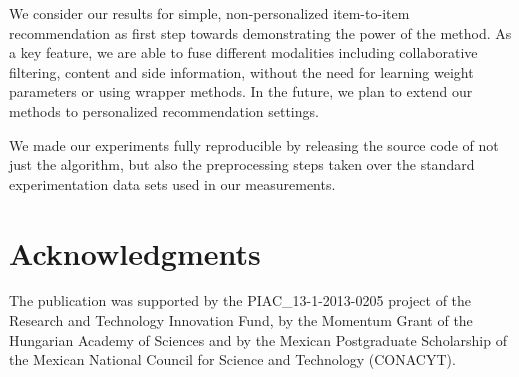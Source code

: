 We consider our results for simple, non-personalized item-to-item recommendation as first step towards demonstrating the power of the method.
As a key feature, we are able to fuse different modalities including collaborative filtering, content and side information, without the need for learning weight parameters or using wrapper methods.
In the future, we plan to extend our methods to personalized recommendation settings.

We made our experiments fully reproducible by releasing the source code of not just the algorithm, but also the preprocessing steps taken over the standard 
experimentation data sets used in our measurements.

\section{Acknowledgments}
The publication was supported by the PIAC\_13-1-2013-0205 project of the Research and Technology Innovation Fund, by the Momentum Grant of the Hungarian Academy of Sciences and by the Mexican Postgraduate Scholarship of the Mexican National Council for Science and Technology (CONACYT). 

